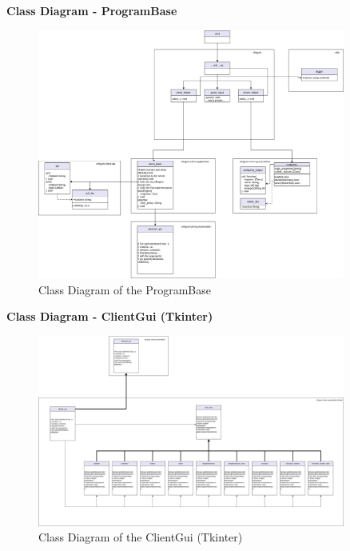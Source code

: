 \documentclass[12pt,a4paper]{article}
\newcommand{\<}[1]{\guilsinglleft}
\renewcommand{\>}[1]{\guilsinglright}
\begin{document}
\newpage

\noindent \textbf{Class Diagram - ProgramBase}

\begin{figure}[ht]
    \begin{center}
    \includegraphics[width=0.9\textwidth]{imgs/pt-v3-class-diag-program-base.png}
    \caption{Class Diagram of the ProgramBase}
    \label{fig:pt-v3-class-diag-program-base}
    \end{center}
\end{figure}

\newpage

\noindent \textbf{Class Diagram - ClientGui (Tkinter)}

\begin{figure}[ht]
    \begin{center}
    \includegraphics[width=0.9\textwidth]{imgs/pt-v3-class-diag-tkinter-client.png}
    \caption{Class Diagram of the ClientGui (Tkinter)}
    \label{fig:pt-v3-class-diag-tkinter}
    \end{center}
\end{figure}
\end{document}
